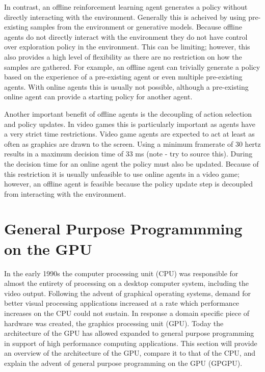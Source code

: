 In contrast, an offline reinforcement learning agent generates a policy without directly interacting with the environment. Generally this is acheived by using pre-existing samples from the environment or generative models. Because offline agents do not directly interact with the environment they do not have control over exploration policy in the environment. This can be limiting; however, this also provides a high level of flexibility as there are no restriction on how the samples are gathered. For example, an offline agent can trivially generate a policy based on the experience of a pre-existing agent or even multiple pre-existing agents. With online agents this is usually not possible, although a pre-existing online agent can provide a starting policy for another agent.

Another important benefit of offline agents is the decoupling of action selection and policy updates. In video games this is particularly important as agents have a very strict time restrictions. Video game agents are expected to act at least as often as graphics are drawn to the screen. Using a minimum framerate of 30 hertz results in a maximum decision time of 33 ms (note - try to source this). During the decision time for an online agent the policy must also be updated. Because of this restriction it is usually unfeasible to use online agents in a video game; however, an offline agent is feasible because the policy update step is decoupled from interacting with the environment.

\section{General Purpose Programmming on the GPU}

In the early 1990s the computer processing unit (CPU) was responsible for almost the entirety of processing on a desktop computer system, including the video output. Following the advent of graphical operating systems, demand for better visual processing applications increased at a rate which performance increases on the CPU could not sustain. In response a domain specific piece of hardware was created, the graphics processing unit (GPU). Today the architecture of the GPU has allowed expanded to general purpose programming in support of high performance computing applications. This section will provide an overview of the architecture of the GPU, compare it to that of the CPU, and explain the advent of general purpose programming on the GPU (GPGPU).

